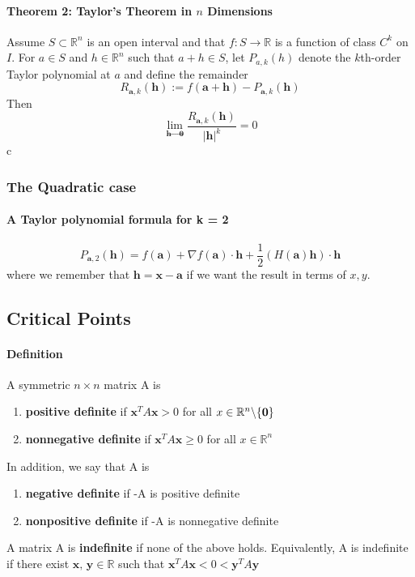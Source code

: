 \documentclass[11pt]{article}
\newcommand{\tb}[1]{\textbf{#1}}
\newcommand{\real}[0]{\mathbb{R}}
\newcommand{\vo}[0]{\tb{0}}
\newcommand{\va}[0]{\tb{a}}
\newcommand{\vh}[0]{\tb{h}}
\begin{document}
\paragraph{Theorem 2: Taylor's Theorem in $n$ Dimensions}Assume $S \subset \real^n$ is an open interval and that $f: S \rightarrow \real$ is a function of class $C^k$ on $I$. For $a \in S$ and $h \in \real^n$ such that $a+h\in S$, let $P_{a,k}(h)$ denote the $k$th-order Taylor polynomial at $a$ and define the remainder
$$R_{\va,k}(\vh) := f(\va+\vh) - P_{\va,k}(\vh)$$
Then $$\lim_{\vh\rightarrow\vo}\frac{R_{\va,k}(\vh)}{|\vh|^k} = 0$$
c
\subsubsection{The Quadratic case}
\paragraph{A Taylor polynomial formula for k = 2}
\begin{equation*}
P_{\tb{a},2}(\tb{h}) = f(\tb{a}) + \nabla f(\tb{a})\cdot \tb{h} + \frac{1}{2}(H(\tb{a})\tb{h})\cdot \tb{h}
\end{equation*}
where we remember that $\tb{h} = \tb{x} - \tb{a}$ if we want the result in terms of $x,y$. 

\subsection{Critical Points}
\paragraph{Definition} A symmetric $n \times n$ matrix A is
\begin{enumerate}
    \item \tb{positive definite} if $\tb{x}^T A \tb{x} > 0$ for all $x \in \real^n \symbol{92} \{\tb{0}\}$
    \item \tb{nonnegative definite} if $\tb{x}^T A \tb{x} \geq 0$ for all $x \in \real^n$
\end{enumerate}
In addition, we say that A is
\begin{enumerate}
    \item \tb{negative definite} if -A is positive definite
    \item \tb{nonpositive definite} if -A is nonnegative definite
\end{enumerate}
A matrix A is \tb{indefinite} if none of the above holds. Equivalently, A is indefinite if there exist $\tb{x, y}\in \real$ such that $\tb{x}^TA\tb{x} < 0 < \tb{y}^TA\tb{y}$
\end{document}
